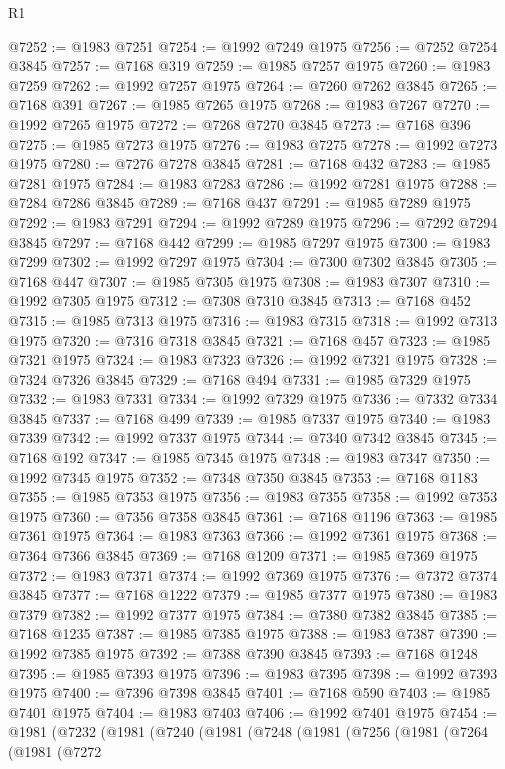 \begin{lexlean}{R1}
\begin{coremodule}
@7252 := @1983 @7251
@7254 := @1992 @7249 @1975
@7256 := @7252 @7254 @3845
@7257 := @7168 @319
@7259 := @1985 @7257 @1975
@7260 := @1983 @7259
@7262 := @1992 @7257 @1975
@7264 := @7260 @7262 @3845
@7265 := @7168 @391
@7267 := @1985 @7265 @1975
@7268 := @1983 @7267
@7270 := @1992 @7265 @1975
@7272 := @7268 @7270 @3845
@7273 := @7168 @396
@7275 := @1985 @7273 @1975
@7276 := @1983 @7275
@7278 := @1992 @7273 @1975
@7280 := @7276 @7278 @3845
@7281 := @7168 @432
@7283 := @1985 @7281 @1975
@7284 := @1983 @7283
@7286 := @1992 @7281 @1975
@7288 := @7284 @7286 @3845
@7289 := @7168 @437
@7291 := @1985 @7289 @1975
@7292 := @1983 @7291
@7294 := @1992 @7289 @1975
@7296 := @7292 @7294 @3845
@7297 := @7168 @442
@7299 := @1985 @7297 @1975
@7300 := @1983 @7299
@7302 := @1992 @7297 @1975
@7304 := @7300 @7302 @3845
@7305 := @7168 @447
@7307 := @1985 @7305 @1975
@7308 := @1983 @7307
@7310 := @1992 @7305 @1975
@7312 := @7308 @7310 @3845
@7313 := @7168 @452
@7315 := @1985 @7313 @1975
@7316 := @1983 @7315
@7318 := @1992 @7313 @1975
@7320 := @7316 @7318 @3845
@7321 := @7168 @457
@7323 := @1985 @7321 @1975
@7324 := @1983 @7323
@7326 := @1992 @7321 @1975
@7328 := @7324 @7326 @3845
@7329 := @7168 @494
@7331 := @1985 @7329 @1975
@7332 := @1983 @7331
@7334 := @1992 @7329 @1975
@7336 := @7332 @7334 @3845
@7337 := @7168 @499
@7339 := @1985 @7337 @1975
@7340 := @1983 @7339
@7342 := @1992 @7337 @1975
@7344 := @7340 @7342 @3845
@7345 := @7168 @192
@7347 := @1985 @7345 @1975
@7348 := @1983 @7347
@7350 := @1992 @7345 @1975
@7352 := @7348 @7350 @3845
@7353 := @7168 @1183
@7355 := @1985 @7353 @1975
@7356 := @1983 @7355
@7358 := @1992 @7353 @1975
@7360 := @7356 @7358 @3845
@7361 := @7168 @1196
@7363 := @1985 @7361 @1975
@7364 := @1983 @7363
@7366 := @1992 @7361 @1975
@7368 := @7364 @7366 @3845
@7369 := @7168 @1209
@7371 := @1985 @7369 @1975
@7372 := @1983 @7371
@7374 := @1992 @7369 @1975
@7376 := @7372 @7374 @3845
@7377 := @7168 @1222
@7379 := @1985 @7377 @1975
@7380 := @1983 @7379
@7382 := @1992 @7377 @1975
@7384 := @7380 @7382 @3845
@7385 := @7168 @1235
@7387 := @1985 @7385 @1975
@7388 := @1983 @7387
@7390 := @1992 @7385 @1975
@7392 := @7388 @7390 @3845
@7393 := @7168 @1248
@7395 := @1985 @7393 @1975
@7396 := @1983 @7395
@7398 := @1992 @7393 @1975
@7400 := @7396 @7398 @3845
@7401 := @7168 @590
@7403 := @1985 @7401 @1975
@7404 := @1983 @7403
@7406 := @1992 @7401 @1975
@7454 := @1981
    (@7232
      (@1981
        (@7240
          (@1981
            (@7248
              (@1981
                (@7256
                  (@1981
                    (@7264
                      (@1981
                        (@7272

\end{coremodule}
\end{lexlean}
